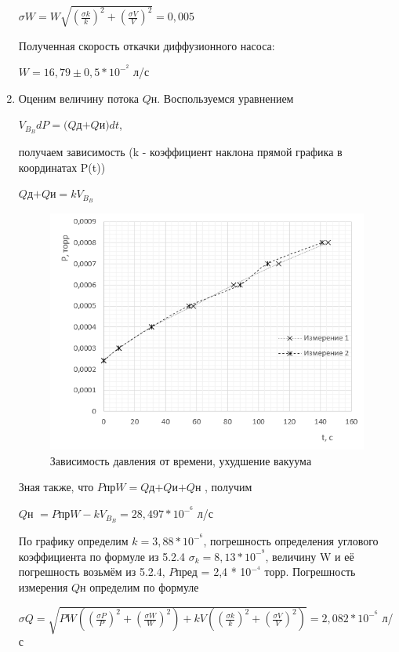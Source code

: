 \documentclass[a4paper]{article}
\begin{document}
\begin{enumerate}
\begin{center}
$\sigma W = W\sqrt{(\frac{\sigma k}{k})^2+(\frac{\sigma V}{V})^2} = 0,005$
\end{center}
Полученная скорость откачки диффузионного насоса:
\begin{center}
$W = 16,79 \pm 0,5 * 10^-^2$ л/с
\end{center}

\item Оценим величину потока $Q$н. Воспользуемся уравнением 
\begin{center}
$V_B_B dP = (Q$д$ + Q$и$)dt$,
\end{center}
получаем зависимость (k - коэффициент наклона прямой графика в координатах P(t))
\begin{center}
$Q$д$ + Q$и$ = k V_B_B$
\end{center}

\begin{figure}[h]
    \centering
    \includegraphics[width=\textwidth]{graph2.PNG}
    \caption{Зависимость давления от времени, ухудшение вакуума}
    \label{fig:vac}
\end{figure}

Зная также, что $P$пр$W = Q$д$ + Q$и$ + Q$н , получим
\begin{center}
$Q$н $= P$пр$W - k V_B_B = 28,497 * 10^-^6$ л/с
\end{center}

По графику определим $k = 3,88 * 10^-^6$, погрешность определения углового коэффициента по формуле из 5.2.4 $\sigma_k = 8,13 * 10^-^9$, величину W и её погрешность возьмём из 5.2.4, $P$пред = 2,4 * 10$^-^4$ торр. Погрешность измерения $Q$н определим по формуле
\begin{center}
$\sigma Q = \sqrt{PW((\frac{\sigma P}{P})^2+(\frac{\sigma W}{W})^2) + kV((\frac{\sigma k}{k})^2+(\frac{\sigma V}{V})^2)} = 2,082 * 10^-^6$ л/с
\end{center}


\end{enumerate}
\end{document}
